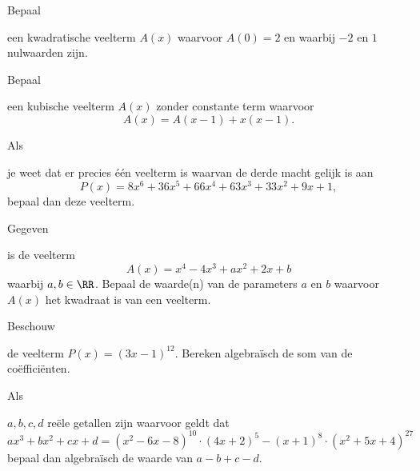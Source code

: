 \documentclass{ximera}
\begin{document}
\begin{Oefening}\setcounter{enumi}{13} 
\hypertarget{oef1.13}{Bepaal} een kwadratische veelterm $A(x)$ waarvoor $A(0) = 2$ en waarbij $-2$ en $1$ nulwaarden zijn.
\end{Oefening}

\begin{Oefening}\setcounter{enumi}{14} 
\hypertarget{oef1.14}{Bepaal} een kubische veelterm $A(x)$ zonder constante term waarvoor
\[
A(x) = A(x-1) + x(x-1).
\]
\end{Oefening}

\begin{Oefening}\setcounter{enumi}{15} 
\hypertarget{oef1.15}{Als} je weet dat er precies \'e\'en veelterm is waarvan de derde macht gelijk is aan 
\[
P(x) = 8x^6 + 36x^5 + 66x^4 + 63x^3 + 33x^2 + 9x + 1,
\]
bepaal dan deze veelterm.
\end{Oefening}

\begin{Oefening}\setcounter{enumi}{16} 
\hypertarget{oef1.16}{Gegeven} is de veelterm
\[
A(x) = x^4 - 4x^3 + ax^2 + 2x + b
\]
waarbij $a,b \in \RR$. Bepaal de waarde(n) van de parameters $a$ en $b$ waarvoor $A(x)$ het kwadraat is van een veelterm. 
\end{Oefening}

\begin{Oefening}\setcounter{enumi}{17} 
\hypertarget{oef1.17}{Beschouw} de veelterm $P(x) = (3x - 1)^{12}$. Bereken algebra\"isch de som van de co\"effici\"enten. 
\end{Oefening}

\begin{Oefening}\setcounter{enumi}{18} 
\hypertarget{oef1.18}{Als} $a,b,c,d$ re\"ele getallen zijn waarvoor geldt dat
\[
ax^3 + bx^2 + cx + d = (x^2-6x-8)^{10}\cdot(4x+2)^5 - (x+1)^8\cdot(x^2+5x+4)^{27}
\]
bepaal dan algebra\"isch de waarde van $a-b+c-d$.
\end{Oefening}
\end{document}
